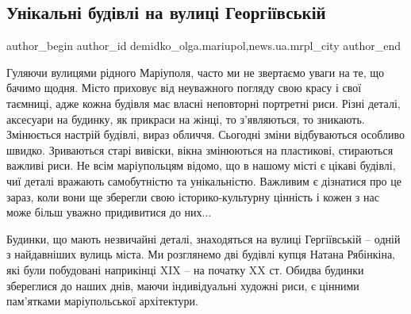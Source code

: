  
 
 
 
 
 
\subsection{Унікальні будівлі на вулиці Георгіївській}
\label{sec:09_09_2017.stz.news.ua.mrpl_city.2.unikalni_budivli_na_vulyci_georgiivskij}
 
\ifcmt
 author_begin
   author_id demidko_olga.mariupol,news.ua.mrpl_city
 author_end
\fi

Гуляючи вулицями рідного Маріуполя, часто ми не звертаємо уваги на те, що
бачимо щодня. Місто приховує від неуважного погляду свою красу і свої таємниці,
адже кожна будівля має власні неповторні портретні риси. Різні деталі,
аксесуари на будинку, як прикраси на жінці, то з'являються, то зникають.
Змінюється настрій будівлі, вираз обличчя. Сьогодні зміни відбуваються особливо
швидко. Зриваються старі вивіски, вікна змінюються на пластикові, стираються
важливі риси. Не всім маріупольцям відомо, що в нашому місті є цікаві будівлі,
чиї деталі вражають самобутністю та унікальністю. Важливим є дізнатися про це
зараз, коли вони ще зберегли свою історико-культурну цінність і кожен з нас
може більш уважно придивитися до них...

Будинки, що мають незвичайні деталі, знаходяться на вулиці Гергіївській – одній
з найдавніших вулиць міста. Ми розглянемо дві будівлі купця Натана Рябінкіна,
які були побудовані наприкінці XIX – на початку XX ст. Обидва будинки
збереглися до наших днів, маючи індивідуальні художні риси, є цінними
пам'ятками маріупольської архітектури.


